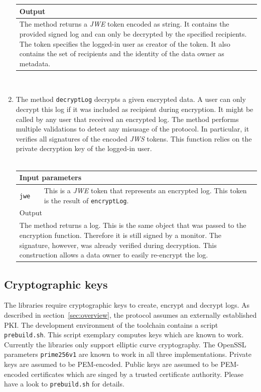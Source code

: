 \documentclass[../main.tex]{subfiles}
\begin{document}
\begin{enumerate}
\begin{tabular}{p{3cm}p{9cm}}
        \multicolumn{2}{l}{Output}   \\ \hline
        \multicolumn{2}{p{12cm}}{The method returns a \textit{JWE} token encoded as string. It contains the provided signed log and can only be decrypted by the specified recipients. The token specifies the logged-in user as creator of the token. It also contains the set of recipients and the identity of the data owner as metadata.}
    \end{tabular} \\
    \item
    The method \verb|decryptLog| decrypts a given encrypted data.
    A user can only decrypt this log if it was included as recipient during encryption.
    It might be called by any user that received an encrypted log.
    The method performs multiple validations to detect any misusage of the protocol.
    In particular, it verifies all signatures of the encoded \textit{JWS} tokens.
    This function relies on the private decryption key of the logged-in user. \\\\
    \begin{tabular}{p{3cm}p{9cm}}
        \hline
        \multicolumn{2}{l}{Input parameters}    \\ \hline
        \verb|jwe|              & This is a \textit{JWE} token that represents an encrypted log. This token is the result of \verb|encryptLog|. \\ \hline
         \multicolumn{2}{l}{Output}   \\ \hline
        \multicolumn{2}{p{12cm}}{The method returns a log. This is the same object that was passed to the encryption function. Therefore it is still signed by a monitor. The signature, however, was already verified during decryption. This construction allows a data owner to easily re-encrypt the log.}
    \end{tabular}
\end{enumerate}

\subsection{Cryptographic keys}

The libraries require cryptographic keys to create, encrypt and decrypt logs.
As described in section~\ref{sec:overview}, the protocol assumes an externally established PKI.
The development environment of the toolchain contains a script \verb|prebuild.sh|.
This script exemplary computes keys which are known to work.
Currently the libraries only support elliptic curve cryptography.
The OpenSSL parameters \verb|prime256v1| are known to work in all three implementations.
Private keys are assumed to be PEM-encoded.
Public keys are assumed to be PEM-encoded certificates which are singed by a trusted certificate authority.
Please have a look to \verb|prebuild.sh| for details.
\end{document}
